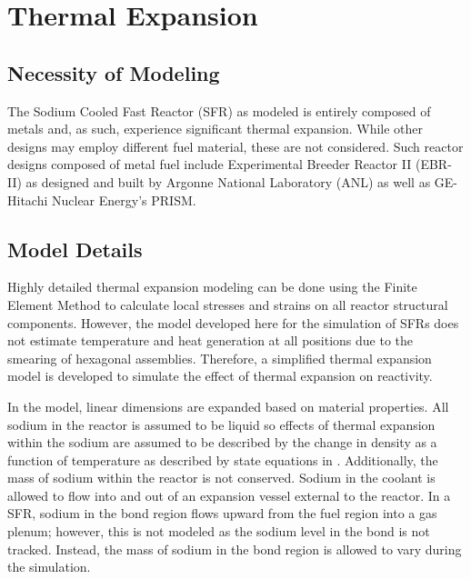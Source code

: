 \chapter{Thermal Expansion}
\label{ch:thermalExpansion}

\section{Necessity of Modeling}
  The Sodium Cooled Fast Reactor (SFR) as modeled is entirely composed of
  metals and, as such, experience significant thermal expansion. While other 
  designs may employ different fuel material, these are not considered. Such
  reactor designs composed of metal fuel include Experimental Breeder Reactor II
  (EBR-II) as designed and built by Argonne National Laboratory (ANL) as well as
  GE-Hitachi Nuclear Energy's PRISM. 

  \cite{PlentifulEnergy}

\section{Model Details}
  Highly detailed thermal expansion modeling can be done using the Finite
  Element Method to calculate local stresses and strains on all reactor
  structural components. However, the model developed here for the simulation of
  SFRs does not estimate temperature and heat generation at all positions due to
  the smearing of hexagonal assemblies. Therefore, a simplified thermal
  expansion model is developed to simulate the effect of thermal expansion on
  reactivity.

  In the model, linear dimensions are expanded based on material properties.
  All sodium in the reactor is assumed to be liquid so effects of thermal
  expansion within the sodium are assumed to be described by the change in
  density as a function of temperature as described by state equations in
  \cite{sodiumProp}. Additionally, the mass of sodium within the reactor is not
  conserved. Sodium in the coolant is allowed to flow into and out of an
  expansion vessel external to the reactor. In a SFR, sodium in the bond region
  flows upward from the fuel region into a gas plenum; however, this is not
  modeled as the sodium level in the bond is not tracked. Instead, the mass of
  sodium in the bond region is allowed to vary during the simulation.

